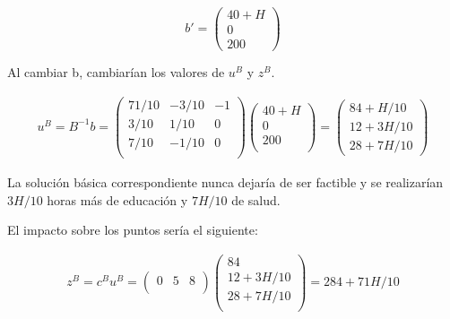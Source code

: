 \begin{enumerate}
    \begin{equation}
    b'=
    \begin{pmatrix}
    40 + H \\
    0\\
    200
    \end{pmatrix}    
    \end{equation}

    Al cambiar b, cambiarían los valores de $u^B$ y $z^B$.

    \begin{equation}
    \begin{split}
    u^B=B^{-1}b = \begin{pmatrix}
    71/10 & -3/10 & -1\\
    3/10 & 1/10 & 0\\
    7/10 & -1/10 & 0\\
    \end{pmatrix}
    \begin{pmatrix}
    40 + H\\
    0\\
    200\\
    \end{pmatrix}
     = \begin{pmatrix}
    84+H/10\\
    12+3H/10\\
    28+7H/10
    \end{pmatrix}
    \end{split}
    \end{equation}

    La solución básica correspondiente nunca dejaría de ser factible y se realizarían $3H/10$ horas más de educación y $7H/10$ de salud.

    El impacto sobre los puntos sería el siguiente:

    \begin{equation}
    \begin{split}
    z^B=c^Bu^B = \begin{pmatrix}
    0 & 5 & 8\\
    \end{pmatrix}
    \begin{pmatrix}
    84\\
    12+3H/10\\
    28+7H/10\\
    \end{pmatrix}
     = 284 + 71H/10\end{split}
    \end{equation} 


\end{enumerate}

